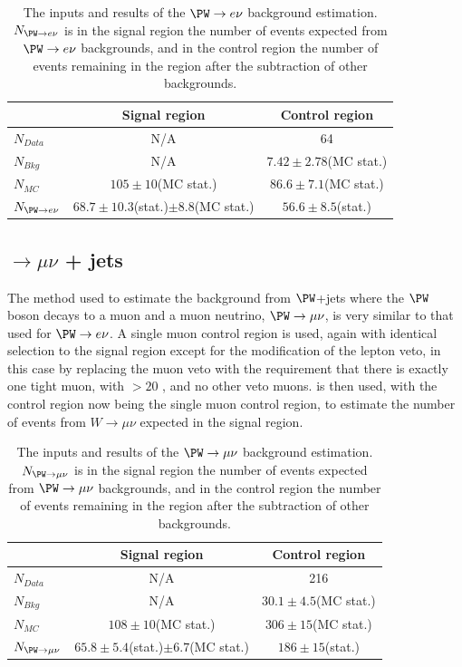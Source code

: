 \begin{table}
  \caption{The inputs and results of the $\PW\rightarrow e\nu$ background estimation. $N_{\PW\rightarrow e\nu}$ is in the signal region the number of events expected from $\PW\rightarrow e\nu$ backgrounds, and in the control region the number of events remaining in the region after the subtraction of other backgrounds.}
  \label{tab:promptwenu}
  \begin{tabular}{|l|c|c|}
    \hline
    & Signal region & Control region \\
    \hline
    $N_{Data}$ & N/A & 64\\
    $N_{Bkg}$ & N/A & $7.42\pm2.78$(\ac{MC} stat.) \\
    $N_{MC}$& $105\pm10$(\ac{MC} stat.) & $86.6\pm 7.1$(\ac{MC} stat.) \\
    $N_{\PW\rightarrow e\nu}$& $68.7\pm 10.3$(stat.)$\pm 8.8$(\ac{MC} stat.) & $56.6\pm 8.5$(stat.) \\
    \hline
  \end{tabular}
\end{table}

\subsection{\PW$\rightarrow \mu\nu$ + jets}%
\label{sec:promptwmunu}
The method used to estimate the background from $\PW$+jets where the $\PW$ boson decays to a muon and a muon neutrino, $\PW\rightarrow\mu\nu$, is very similar to that used for $\PW\rightarrow e\nu$. A single muon control region is used, again with identical selection to the signal region except for the modification of the lepton veto, in this case by replacing the muon veto with the requirement that there is exactly one tight muon, with \pt$>20$ \GeV, and no other veto muons.  is then used, with the control region now being the single muon control region, to estimate the number of events from $W\rightarrow\mu\nu$ expected in the signal region.

\begin{table}
  \caption{The inputs and results of the $\PW\rightarrow \mu\nu$ background estimation. $N_{\PW\rightarrow \mu\nu}$ is in the signal region the number of events expected from $\PW\rightarrow \mu\nu$ backgrounds, and in the control region the number of events remaining in the region after the subtraction of other backgrounds.}
  \label{tab:promptwenu}
  \begin{tabular}{|l|c|c|}
    \hline
    & Signal region & Control region \\
    \hline
    $N_{Data}$ & N/A & 216\\
    $N_{Bkg}$ & N/A & $30.1\pm 4.5$(\ac{MC} stat.) \\
    $N_{MC}$& $108\pm 10$(\ac{MC} stat.) & $306\pm 15$(\ac{MC} stat.) \\
    $N_{\PW\rightarrow \mu\nu}$& $65.8\pm 5.4$(stat.)$\pm 6.7$(\ac{MC} stat.) & $186\pm 15$(stat.) \\
    \hline
  \end{tabular}
\end{table}

